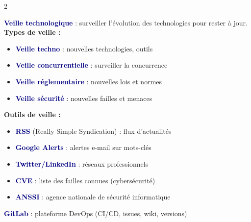 \documentclass[a4paper,10pt]{article}
\newcommand{\key}[1]{\textbf{\textcolor{navy}{#1}}}
\begin{document}
\begin{multicols}{2}
\begin{tcolorbox}[basebox, colframe=green, title=10. Activités Transversales — Veille technologique]
\key{Veille technologique} : surveiller l'évolution des technologies pour rester à jour.\\[4pt]
\textbf{Types de veille :}
\begin{itemize}
  \item \key{Veille techno} : nouvelles technologies, outils
  \item \key{Veille concurrentielle} : surveiller la concurrence
  \item \key{Veille réglementaire} : nouvelles lois et normes
  \item \key{Veille sécurité} : nouvelles failles et menaces
\end{itemize}
\vspace{4pt}
\textbf{Outils de veille :}
\begin{itemize}
  \item \key{RSS} (Really Simple Syndication) : flux d'actualités
  \item \key{Google Alerts} : alertes e-mail sur mots-clés
  \item \key{Twitter/LinkedIn} : réseaux professionnels
  \item \key{CVE} : liste des failles connues (cybersécurité)
  \item \key{ANSSI} : agence nationale de sécurité informatique
\end{itemize}
\vspace{4pt}
\key{GitLab} : plateforme DevOps (CI/CD, issues, wiki, versions)
\end{tcolorbox}

\end{multicols}
\end{document}
